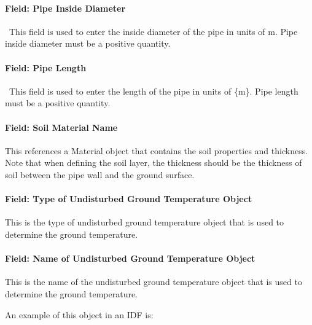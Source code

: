 \paragraph{Field: Pipe Inside Diameter}\label{field-pipe-inside-diameter-2}

~This field is used to enter the inside diameter of the pipe in units of m. Pipe inside diameter must be a positive quantity.

\paragraph{Field: Pipe Length}\label{field-pipe-length-2}

~This field is used to enter the length of the pipe in units of \{m\}. Pipe length must be a positive quantity.

\paragraph{Field: Soil Material Name}\label{field-soil-material-name}

This references a Material object that contains the soil properties and thickness.~ Note that when defining the soil layer, the thickness should be the thickness of soil between the pipe wall and the ground surface.

\paragraph{Field: Type of Undisturbed Ground Temperature Object}\label{field-type-of-undisturbed-ground-temperature-object-001}

This is the type of undisturbed ground temperature object that is used to determine the ground temperature.

\paragraph{Field: Name of Undisturbed Ground Temperature Object}\label{field-name-of-undisturbed-ground-temperature-object-001}

This is the name of the undisturbed ground temperature object that is used to determine the ground temperature.

An example of this object in an IDF is:

